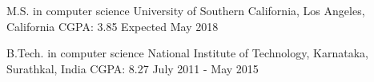 \begin{cventries}
  \cventry
    {M.S. in computer science}
    {University of Southern California, Los Angeles, California}
    {CGPA: 3.85}
    {Expected  May 2018}
    {}\vspace{-0.5cm} 
    
    \cventry
    {B.Tech. in computer science}
    {National Institute of Technology, Karnataka, Surathkal, India}
    {CGPA: 8.27}
    {July 2011 - May 2015}
    {}
\end{cventries}
